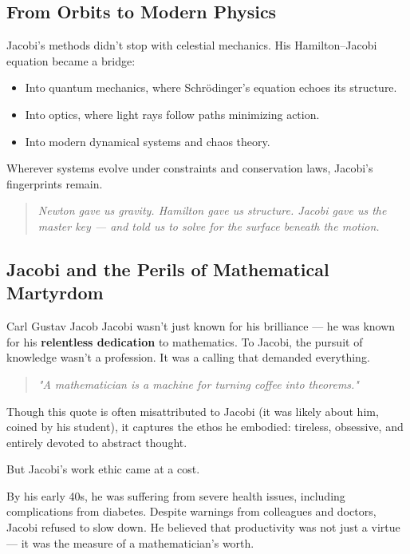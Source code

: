 \subsection*{From Orbits to Modern Physics}

Jacobi’s methods didn’t stop with celestial mechanics. His Hamilton–Jacobi equation became a bridge:

\begin{itemize}
  \item Into quantum mechanics, where Schrödinger’s equation echoes its structure.
  \item Into optics, where light rays follow paths minimizing action.
  \item Into modern dynamical systems and chaos theory.
\end{itemize}

Wherever systems evolve under constraints and conservation laws, Jacobi’s fingerprints remain.

\begin{quote}
\textit{Newton gave us gravity.  
Hamilton gave us structure.  
Jacobi gave us the master key — and told us to solve for the surface beneath the motion.}
\end{quote}


\subsection{Jacobi and the Perils of Mathematical Martyrdom}

    Carl Gustav Jacob Jacobi wasn’t just known for his brilliance — he was known for his \textbf{relentless dedication} to mathematics. To Jacobi, the pursuit of knowledge wasn’t a profession. It was a calling that demanded everything.
    
    \begin{quote}
    \textit{"A mathematician is a machine for turning coffee into theorems."}
    \end{quote}
    
    Though this quote is often misattributed to Jacobi (it was likely about him, coined by his student), it captures the ethos he embodied: tireless, obsessive, and entirely devoted to abstract thought.
    
    \medskip
    
    But Jacobi’s work ethic came at a cost.
    
    By his early 40s, he was suffering from severe health issues, including complications from diabetes. Despite warnings from colleagues and doctors, Jacobi refused to slow down. He believed that productivity was not just a virtue — it was the measure of a mathematician’s worth.
    
